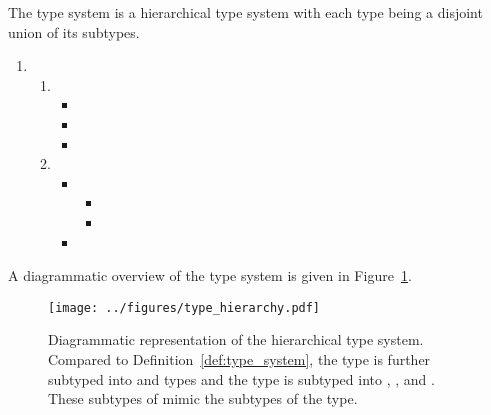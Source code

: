\begin{definition}\label{def:type_system}
	The \dcproblogsty type system is a hierarchical type system with each type being a disjoint union of its subtypes.
	\begin{enumerate}
		\item[]  
		\begin{enumerate}
			\item[1.] 
			\begin{itemize}
				\item {}
				\item {}
				\item {}
			\end{itemize}
			\item[2.] 
			\begin{itemize}		
				\item {}
				\begin{itemize}
					\item  {}
					\item {}
				\end{itemize}
				\item {}
			\end{itemize}
		\end{enumerate}
	\end{enumerate}
\end{definition}

A diagrammatic overview of the \dcproblogsty type system is given in Figure~\ref{fig:type_system}.

\begin{figure}[t]
	\begin{center}
		\texttt{[image: ../figures/type\_hierarchy.pdf]}
	\end{center}
	\caption[Diagrammatic representation of the hierarchical \dcproblogsty type system.]{Diagrammatic representation of the hierarchical \dcproblogsty type system. Compared to Definition~\ref{def:type_system},  the  type is further subtyped into  and  types and the  type is subtyped into , , and . These subtypes of  mimic the subtypes of the  type.}
	\label{fig:type_system}
\end{figure}



